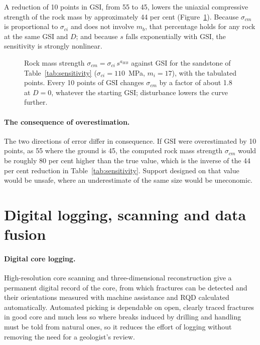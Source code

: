 A reduction of 10 points in GSI, from 55 to 45, lowers the uniaxial
compressive strength of the rock mass by approximately 44 per cent
(Figure~\ref{fig:gsi-strength-sensitivity}). Because
\(\sigma_{cm}\) is proportional to \(\sigma_{ci}\) and does not involve
\(m_b\), that percentage holds for any rock at the same GSI and \(D\); and
because \(s\) falls exponentially with GSI, the sensitivity is strongly
nonlinear.

\begin{figure}[htbp]
\centering
{}
\caption{Rock mass strength $\sigma_{cm} = \sigma_{ci}\,s^{a_{HB}}$ against GSI for the sandstone of Table~\ref{tab:sensitivity} ($\sigma_{ci} = 110$~MPa, $m_i = 17$), with the tabulated points. Every 10 points of GSI changes $\sigma_{cm}$ by a factor of about 1.8 at $D = 0$, whatever the starting GSI; disturbance lowers the curve further.}
\label{fig:gsi-strength-sensitivity}
\end{figure}

\paragraph{The consequence of overestimation.}
The two directions of error differ in consequence. If GSI were overestimated by 10
points, as 55 where the ground is 45, the computed rock mass strength
$\sigma_{cm}$ would be roughly 80 per cent higher than the true value, which is the
inverse of the 44 per cent reduction in Table~\ref{tab:sensitivity}. Support
designed on that value would be unsafe, where an underestimate of the same
size would be uneconomic.

\section{Digital logging, scanning and data fusion}
\label{sec:modern-techniques-and-engineering-judgement}

\paragraph{Digital core logging.}
High-resolution core scanning and three-dimensional reconstruction give a
permanent digital record of the core, from which fractures can be detected
and their orientations measured with machine assistance and RQD calculated
automatically. Automated picking is dependable on open, clearly traced
fractures in good core and much less so where breaks induced by drilling and
handling must be told from natural ones, so it reduces the effort of logging
without removing the need for a geologist's review.

